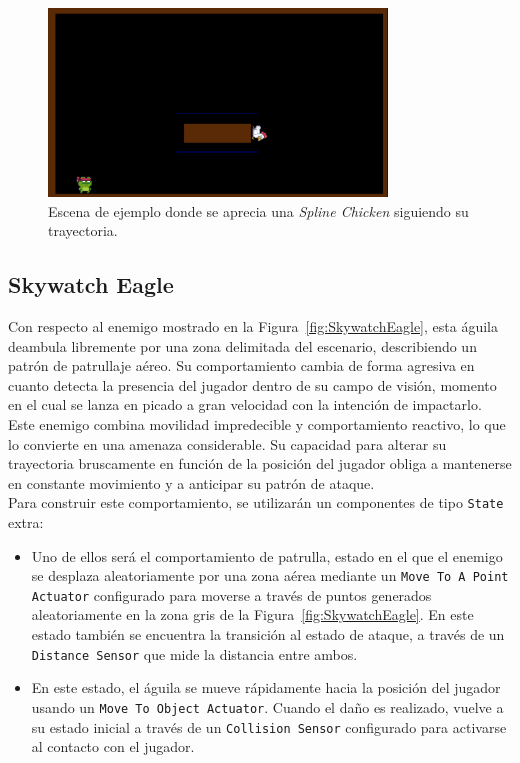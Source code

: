 \begin{figure}[t]
	\centering
	\includegraphics[height=5cm]{Imagenes/Gallina_Spline.png}
	\caption{Escena de ejemplo donde se aprecia una \textit{Spline Chicken} siguiendo su trayectoria.}
	\label{fig:SplineChicken}
\end{figure}

\subsection{Skywatch Eagle}

Con respecto al enemigo mostrado en la Figura~\ref{fig:SkywatchEagle}, esta águila deambula libremente por una zona delimitada del escenario, describiendo un patrón de patrullaje aéreo. Su comportamiento cambia de forma agresiva en cuanto detecta la presencia del jugador dentro de su campo de visión, momento en el cual se lanza en picado a gran velocidad con la intención de impactarlo.\\

Este enemigo combina movilidad impredecible y comportamiento reactivo, lo que lo convierte en una amenaza considerable. Su capacidad para alterar su trayectoria bruscamente en función de la posición del jugador obliga a mantenerse en constante movimiento y a anticipar su patrón de ataque.\\

Para construir este comportamiento, se utilizarán un componentes de tipo \texttt{State} extra:

\begin{itemize}
\item Uno de ellos será el comportamiento de patrulla, estado en el que el enemigo se desplaza aleatoriamente por una zona aérea mediante un \texttt{Move To A Point Actuator} configurado para moverse a través de puntos generados aleatoriamente en la zona gris de la  Figura~\ref{fig:SkywatchEagle}. En este estado también se encuentra la transición al estado de ataque, a través de un \texttt{Distance Sensor} que mide la distancia entre ambos. \\
\item En este estado, el águila se mueve rápidamente hacia la posición del jugador usando un \texttt{Move To Object Actuator}. Cuando el daño es realizado, vuelve a su estado inicial a través de un \texttt{Collision Sensor} configurado para activarse al contacto con el jugador.
\end{itemize}

